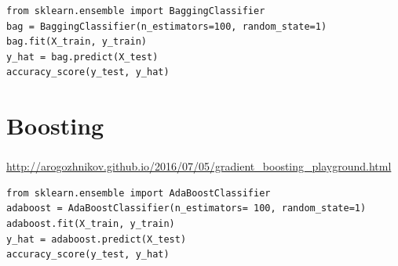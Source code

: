 \begin{frame}[fragile]\frametitle{}
\tiny	
\begin{lstlisting}
from sklearn.ensemble import BaggingClassifier
bag = BaggingClassifier(n_estimators=100, random_state=1)
bag.fit(X_train, y_train)
y_hat = bag.predict(X_test)
accuracy_score(y_test, y_hat)
\end{lstlisting} 
\end{frame}
\section{Boosting}
\begin{frame}[fragile]\frametitle{}
\tiny	
\url{http://arogozhnikov.github.io/2016/07/05/gradient_boosting_playground.html}
\begin{lstlisting}
from sklearn.ensemble import AdaBoostClassifier
adaboost = AdaBoostClassifier(n_estimators= 100, random_state=1)
adaboost.fit(X_train, y_train)
y_hat = adaboost.predict(X_test)
accuracy_score(y_test, y_hat)
\end{lstlisting} 
\end{frame}






%

%
%
%


